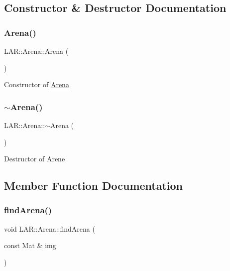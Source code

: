\subsection{Constructor \& Destructor Documentation}
\mbox{\label{class_l_a_r_1_1_arena_aab5beeb938591f801c712269787e7368}} 
\subsubsection{\texorpdfstring{Arena()}{Arena()}}
{\footnotesize\ttfamily L\+A\+R\+::\+Arena\+::\+Arena (\begin{DoxyParamCaption}{ }\end{DoxyParamCaption})}

Constructor of \mbox{\hyperlink{class_l_a_r_1_1_arena}{Arena}} \mbox{\label{class_l_a_r_1_1_arena_abf0ebe4fb9fd22c466c91ef7975b37fc}} 
\subsubsection{\texorpdfstring{$\sim$\+Arena()}{~Arena()}}
{\footnotesize\ttfamily L\+A\+R\+::\+Arena\+::$\sim$\+Arena (\begin{DoxyParamCaption}{ }\end{DoxyParamCaption})}

Destructor of Arene 

\subsection{Member Function Documentation}
\mbox{\label{class_l_a_r_1_1_arena_afea06d76528c01c7764134713c305340}} 
\subsubsection{\texorpdfstring{find\+Arena()}{findArena()}}
{\footnotesize\ttfamily void L\+A\+R\+::\+Arena\+::find\+Arena (\begin{DoxyParamCaption}\item[{const Mat \&}]{img }\end{DoxyParamCaption})}


